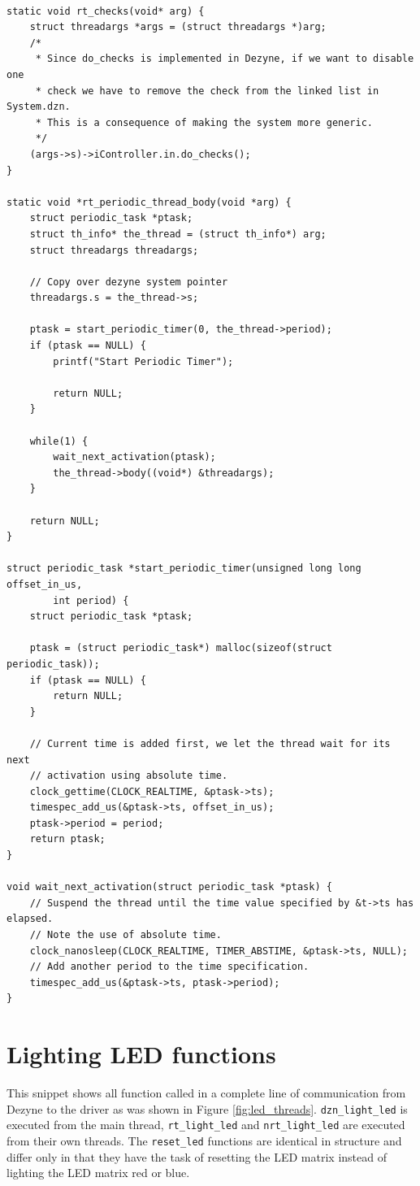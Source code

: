 \documentclass[12pt]{scrreprt}
\begin{document}
\begin{appendices}
\begin{verbatim}

static void rt_checks(void* arg) {
    struct threadargs *args = (struct threadargs *)arg;
    /*
     * Since do_checks is implemented in Dezyne, if we want to disable one
     * check we have to remove the check from the linked list in System.dzn.
     * This is a consequence of making the system more generic. 
     */
    (args->s)->iController.in.do_checks();
}

static void *rt_periodic_thread_body(void *arg) {
    struct periodic_task *ptask;
    struct th_info* the_thread = (struct th_info*) arg;
    struct threadargs threadargs;

    // Copy over dezyne system pointer
    threadargs.s = the_thread->s;

    ptask = start_periodic_timer(0, the_thread->period);
    if (ptask == NULL) {
        printf("Start Periodic Timer");

        return NULL;
    }

    while(1) {
        wait_next_activation(ptask);
        the_thread->body((void*) &threadargs);
    }

    return NULL;
}

struct periodic_task *start_periodic_timer(unsigned long long offset_in_us,
        int period) {
    struct periodic_task *ptask;

    ptask = (struct periodic_task*) malloc(sizeof(struct periodic_task));
    if (ptask == NULL) {
        return NULL;
    }

    // Current time is added first, we let the thread wait for its next
    // activation using absolute time.
    clock_gettime(CLOCK_REALTIME, &ptask->ts);
    timespec_add_us(&ptask->ts, offset_in_us);
    ptask->period = period;
    return ptask;
}

void wait_next_activation(struct periodic_task *ptask) {
    // Suspend the thread until the time value specified by &t->ts has elapsed.
    // Note the use of absolute time.
    clock_nanosleep(CLOCK_REALTIME, TIMER_ABSTIME, &ptask->ts, NULL);
    // Add another period to the time specification.
    timespec_add_us(&ptask->ts, ptask->period);
}

\end{verbatim}

\section{Lighting LED functions}
This snippet shows all function called in a complete line of communication from Dezyne to the driver as was shown in Figure \ref{fig:led_threads}. \texttt{dzn\_light\_led} is executed from the main thread, \texttt{rt\_light\_led} and \texttt{nrt\_light\_led} are executed from their own threads. The \texttt{reset\_led} functions are identical in structure and differ only in that they have the task of resetting the LED matrix instead of lighting the LED matrix red or blue.


\end{appendices}
\end{document}
